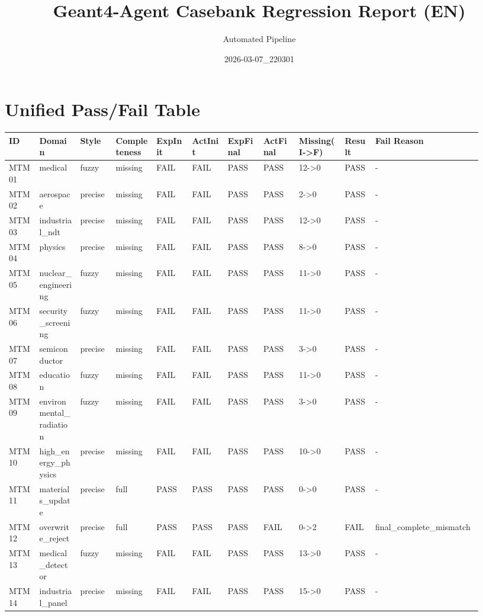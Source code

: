 \documentclass[11pt]{ctexart}
\title{Geant4-Agent Casebank Regression Report (EN)}
\author{Automated Pipeline}
\date{2026-03-07\_220301}
\begin{document}
\maketitle
\section{Unified Pass/Fail Table}
\begin{longtable}{p{0.06\linewidth}p{0.08\linewidth}p{0.07\linewidth}p{0.08\linewidth}p{0.07\linewidth}p{0.07\linewidth}p{0.07\linewidth}p{0.07\linewidth}p{0.09\linewidth}p{0.06\linewidth}p{0.21\linewidth}}
\toprule
ID & Domain & Style & Completeness & ExpInit & ActInit & ExpFinal & ActFinal & Missing(I->F) & Result & Fail Reason \\
\midrule
MTM01 & medical & fuzzy & missing & FAIL & FAIL & PASS & PASS & 12->0 & PASS & - \\
MTM02 & aerospace & precise & missing & FAIL & FAIL & PASS & PASS & 2->0 & PASS & - \\
MTM03 & industrial\_ndt & precise & missing & FAIL & FAIL & PASS & PASS & 12->0 & PASS & - \\
MTM04 & physics & precise & missing & FAIL & FAIL & PASS & PASS & 8->0 & PASS & - \\
MTM05 & nuclear\_engineering & fuzzy & missing & FAIL & FAIL & PASS & PASS & 11->0 & PASS & - \\
MTM06 & security\_screening & fuzzy & missing & FAIL & FAIL & PASS & PASS & 11->0 & PASS & - \\
MTM07 & semiconductor & precise & missing & FAIL & FAIL & PASS & PASS & 3->0 & PASS & - \\
MTM08 & education & fuzzy & missing & FAIL & FAIL & PASS & PASS & 11->0 & PASS & - \\
MTM09 & environmental\_radiation & fuzzy & missing & FAIL & FAIL & PASS & PASS & 3->0 & PASS & - \\
MTM10 & high\_energy\_physics & precise & missing & FAIL & FAIL & PASS & PASS & 10->0 & PASS & - \\
MTM11 & materials\_update & precise & full & PASS & PASS & PASS & PASS & 0->0 & PASS & - \\
MTM12 & overwrite\_reject & precise & full & PASS & PASS & PASS & FAIL & 0->2 & FAIL & final\_complete\_mismatch \\
MTM13 & medical\_detector & fuzzy & missing & FAIL & FAIL & PASS & PASS & 13->0 & PASS & - \\
MTM14 & industrial\_panel & precise & missing & FAIL & FAIL & PASS & PASS & 15->0 & PASS & - \\

\end{longtable}
\end{document}
